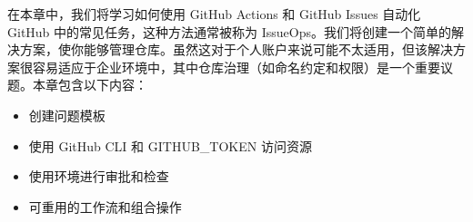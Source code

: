 在本章中，我们将学习如何使用 GitHub Actions 和 GitHub Issues 自动化 GitHub 中的常见任务，这种方法通常被称为 IssueOps。我们将创建一个简单的解决方案，使你能够管理仓库。虽然这对于个人账户来说可能不太适用，但该解决方案很容易适应于企业环境中，其中仓库治理（如命名约定和权限）是一个重要议题。本章包含以下内容：

\begin{itemize}
\item 
创建问题模板

\item 
使用 GitHub CLI 和 GITHUB\_TOKEN 访问资源

\item 
使用环境进行审批和检查

\item 
可重用的工作流和组合操作
\end{itemize}
